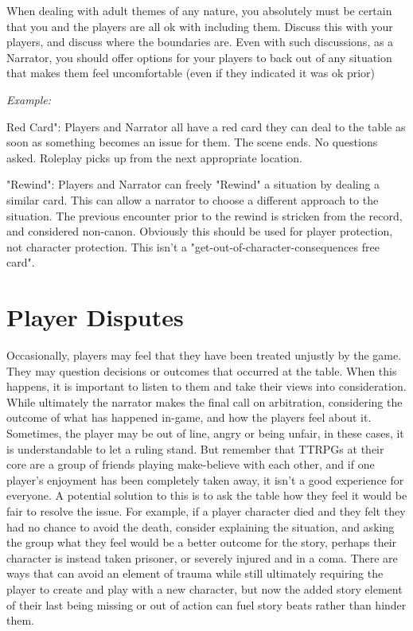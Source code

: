 When dealing with adult themes of any nature, you absolutely must be certain that you and the players are all ok with including them. Discuss this with your players, and discuss where the boundaries are. Even with such discussions, as a Narrator, you should offer options for your players to back out of any situation that makes them feel uncomfortable (even if they indicated it was ok prior)

\textit{Example:}

\begin{displayquote}
    Red Card": Players and Narrator all have a red card they can deal to the table as soon as something becomes an issue for them. The scene ends. No questions asked. Roleplay picks up from the next appropriate location.

    "Rewind": Players and Narrator can freely "Rewind" a situation by dealing a similar card. This can allow a narrator to choose a different approach to the situation. The previous encounter prior to the rewind is stricken from the record, and considered non-canon. Obviously this should be used for player protection, not character protection. This isn't a "get-out-of-character-consequences free card".
\end{displayquote}

\section{Player Disputes}

Occasionally, players may feel that they have been treated unjustly by the game. They may question decisions or outcomes that occurred at the table. When this happens, it is important to listen to them and take their views into consideration. While ultimately the narrator makes the final call on arbitration, considering the outcome of what has happened in-game, and how the players feel about it. Sometimes, the player may be out of line, angry or being unfair, in these cases, it is understandable to let a ruling stand. But remember that TTRPGs at their core are a group of friends playing make-believe with each other, and if one player’s enjoyment has been completely taken away, it isn’t a good experience for everyone.  A potential solution to this is to ask the table how they feel it would be fair to resolve the issue. For example, if a player character died and they felt they had no chance to avoid the death, consider explaining the situation, and asking the group what they feel would be a better outcome for the story, perhaps their character is instead taken prisoner, or severely injured and in a coma. There are ways that can avoid an element of trauma while still ultimately requiring the player to create and play with a new character, but now the added story element of their last being missing or out of action can fuel story beats rather than hinder them.

